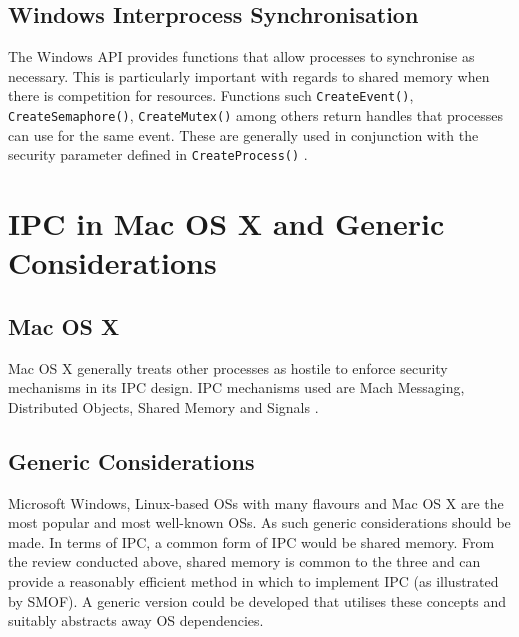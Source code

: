 \documentclass[12pt,a4paper,oneside]{article}
\def\code#1{\texttt{#1}}
\begin{document}
\begin{spacing}{1.4}
\subsection{Windows Interprocess Synchronisation}
The Windows API provides functions that allow processes to synchronise as necessary. This is particularly important with regards to shared memory when there is competition for resources. Functions such \code{CreateEvent()}, \code{CreateSemaphore()}, \code{CreateMutex()} among others return handles that processes can use for the same event. These are generally used in conjunction with the security parameter defined in \code{CreateProcess()} \citep{MSDN_API}.
\end{spacing}

\section{IPC in Mac OS X and Generic Considerations}
\begin{spacing}{1.4}
\subsection{Mac OS X}
Mac OS X generally treats other processes as hostile to enforce security mechanisms in its IPC design. IPC mechanisms used are Mach Messaging, Distributed Objects, Shared Memory and Signals \citep{MAC_API}.

\subsection{Generic Considerations}
Microsoft Windows, Linux-based OSs with many flavours and Mac OS X are the most popular and most well-known OSs. As such generic considerations should be made. In terms of IPC, a common form of IPC would be shared memory. From the review conducted above, shared memory is common to the three and can provide a reasonably efficient method in which to implement IPC (as illustrated by SMOF). A generic version could be developed that utilises these concepts and suitably abstracts away OS dependencies.

\end{spacing}
\end{document}

